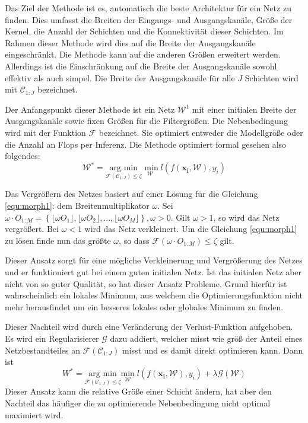 Das Ziel der Methode ist es, automatisch die beste Architektur für ein Netz zu finden. Dies umfasst die Breiten der Eingangs- und Ausgangskanäle, Größe der Kernel, die Anzahl der Schichten und die Konnektivität dieser Schichten. Im Rahmen dieser Methode wird dies auf die Breite der Ausgangskanäle eingeschränkt. Die Methode kann auf die anderen Größen erweitert werden. Allerdings ist die Einschränkung auf die Breite der Ausgangskanäle sowohl effektiv als auch simpel.
Die Breite der Ausgangskanäle für alle $J$ Schichten wird mit $\mathcal{C}_{1:J}$ bezeichnet. 

Der Anfangspunkt dieser Methode ist ein Netz $\mathcal{W}^1$ mit einer initialen Breite der Ausgangskanäle sowie fixen Größen für die Filtergrößen. Die Nebenbedingung wird mit der Funktion $\mathcal{F}$ bezeichnet. Sie optimiert entweder die Modellgröße oder die Anzahl an Flops per Inferenz. Die Methode optimiert formal gesehen also folgendes:
\begin{equation}
 \mathcal{W}^{\ast}= \underset{\mathcal{F}(\mathcal{C}_{1:J})\leq \zeta}{\text{arg min}} \underset{\mathcal{W}}{\text{ min}}\; l(f(\mathbf{x_i}, \mathcal{W}),y_i)\label{equ:morph1}
\end{equation}

Das Vergrößern des Netzes basiert auf einer Lösung für die Gleichung \ref{equ:morph1}: dem Breitenmultiplikator $\omega$. 
Sei $\omega \cdot O_{1:M} = \left\{ \lfloor \omega O_1 \rfloor, \lfloor \omega O_2 \rfloor, \ldots , \lfloor \omega O_M \rfloor \right\}, \omega>0$. Gilt $\omega>1$, so wird das Netz vergrößert. Bei $\omega <1$ wird das Netz verkleinert. Um die Gleichung \ref{equ:morph1} zu lösen finde nun das größte $\omega$, so dass $\mathcal{F}(\omega \cdot O_{1:M})\leq \zeta$ gilt.


Dieser Ansatz sorgt für eine mögliche Verkleinerung und Vergrößerung des Netzes und er funktioniert gut bei einem guten initialen Netz. Ist das initialen Netz aber nicht von so guter Qualität, so hat dieser Ansatz Probleme. Grund hierfür ist wahrscheinlich ein lokales Minimum, aus welchem die Optimierungsfunktion nicht mehr herausfindet um ein besseres lokales oder globales Minimum zu finden.

Dieser Nachteil wird durch eine Veränderung der Verlust-Funktion aufgehoben. Es wird ein Regularisierer $\mathcal{G}$ dazu addiert, welcher misst wie größ der Anteil eines Netzbestandteiles an $\mathcal{F}( \mathcal{C}_{1:J})$ misst und es damit direkt optimieren kann. Dann ist
\begin{equation}
 W^{\ast}= \underset{\mathcal{F}(\mathcal{C}_{1:J})\leq \zeta}{\text{arg min}} \underset{\mathcal{W}}{\text{min}}\; l(f(\mathbf{x_i}, \mathcal{W}),y_i) + \lambda \mathcal{G}( \mathcal{W})  
 \label{equ:morph2}
\end{equation}
Dieser Ansatz kann die relative Größe einer Schicht ändern, hat aber den Nachteil das häufiger die zu optimierende Nebenbedingung nicht optimal maximiert wird.




